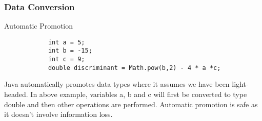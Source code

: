 \documentclass[10pt, compress]{beamer}
\begin{document}
\begin{frame}[fragile]
	\frametitle{Data Conversion}
	\begin{block}{Automatic Promotion}
		\begin{verbatim}
			int a = 5;
			int b = -15;
			int c = 9;
			double discriminant = Math.pow(b,2) - 4 * a *c;
		\end{verbatim}
		Java automatically promotes data types where it assumes we have been light-headed. In above example, variables a, b and c will first be converted to type double and then other operations are performed. Automatic promotion is safe as it doesn't involve information loss.
	\end{block}
\end{frame}

\end{document}
